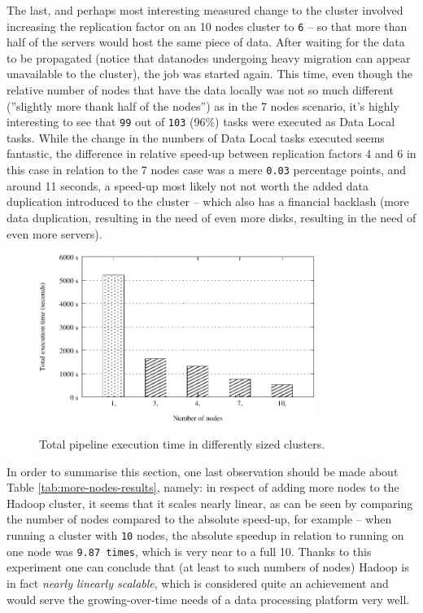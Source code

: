 The last, and perhaps most interesting measured change to the cluster involved increasing the replication factor on an 10 nodes cluster to \verb|6| -- so that more than half of the servers would host the same piece of data. After waiting for the data to be propagated (notice that datanodes undergoing heavy migration can appear unavailable to the cluster), the job was started again. This time, even though the relative number of nodes that have the data locally was not so much different (''slightly more thank half of the nodes'') as in the 7 nodes scenario, it's highly interesting to see that \verb|99| out of \verb|103| (96\%) tasks were executed as Data Local tasks. While the change in the numbers of Data Local tasks executed seems fantastic, the difference in relative speed-up between replication factors 4 and 6 in this case in relation to the 7 nodes case was a mere \verb|0.03| percentage points, and around 11 seconds, a speed-up most likely not not worth the added data duplication introduced to the cluster -- which also has a financial backlash (more data duplication, resulting in the need of even more disks, resulting in the need of even more servers).

\begin{figure}[ch!]
  \centering
  \includegraphics[width=0.80\textwidth]{img/hadoop/nodes-perf.pdf}
  \label{fig:nodes-pers-graph}
  \caption{Total pipeline execution time in differently sized clusters.}
\end{figure}

In order to summarise this section, one last observation should be made about Table \ref{tab:more-nodes-results}, namely: in respect of adding more nodes to the Hadoop cluster, it seems that it scales nearly linear, as can be seen by comparing the number of nodes compared to the absolute speed-up, for example -- when running a cluster with \verb|10| nodes, the absolute speedup in relation to running on one node was \verb|9.87 times|, which is very near to a full 10. Thanks to this experiment one can conclude that (at least to such numbers of nodes) Hadoop is in fact \textit{nearly linearly scalable}, which is considered quite an achievement and would serve the growing-over-time needs of a data processing platform very well.



